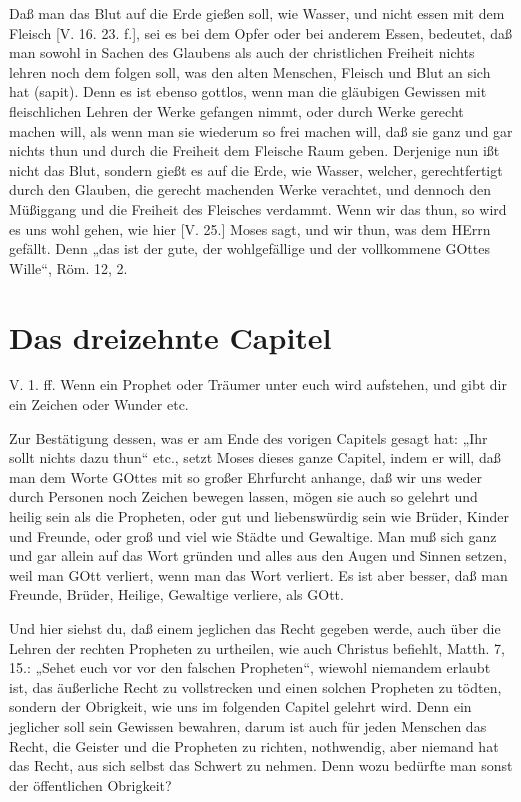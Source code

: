 Daß man das Blut auf die Erde gießen soll, wie Wasser, und nicht essen mit dem Fleisch [V. 16. 23. f.], sei es bei dem Opfer oder bei anderem Essen, bedeutet, daß man sowohl in Sachen des Glaubens als auch der christlichen Freiheit nichts lehren noch dem folgen soll, was den alten Menschen, Fleisch und Blut an sich hat (sapit). Denn es ist ebenso gottlos, wenn man die gläubigen Gewissen mit fleischlichen Lehren der Werke gefangen nimmt, oder durch Werke gerecht machen will, als wenn man sie wiederum so frei machen will, daß sie ganz und gar nichts thun und durch die Freiheit dem Fleische Raum geben. Derjenige nun ißt nicht das Blut, sondern gießt es auf die Erde, wie Wasser, welcher, gerechtfertigt durch den Glauben, die gerecht machenden Werke verachtet, und dennoch den Müßiggang und die Freiheit des Fleisches verdammt. Wenn wir das thun, so wird es uns wohl gehen, wie hier [V. 25.] Moses sagt, und wir thun, was dem HErrn gefällt. Denn „das ist der gute, der wohlgefällige und der vollkommene GOttes Wille“, Röm. 12, 2.

\section{Das dreizehnte Capitel}

\begin{schriftzitat}
V. 1. ff. Wenn ein Prophet oder Träumer unter euch wird aufstehen, und gibt dir ein Zeichen oder Wunder etc.
\end{schriftzitat}

Zur Bestätigung dessen, was er am Ende des vorigen Capitels gesagt hat: „Ihr sollt nichts dazu thun“ etc., setzt Moses dieses ganze Capitel, indem er will, daß man dem Worte GOttes mit so großer Ehrfurcht anhange, daß wir uns weder durch Personen noch Zeichen bewegen lassen, mögen sie auch so gelehrt und heilig sein als die Propheten, oder gut und liebenswürdig sein wie Brüder, Kinder und Freunde, oder groß und viel wie Städte und Gewaltige. Man muß sich ganz und gar allein auf das Wort gründen und alles aus den Augen und Sinnen setzen, weil man GOtt verliert, wenn man das Wort verliert. Es ist aber besser, daß man Freunde, Brüder, Heilige, Gewaltige verliere, als GOtt.

Und hier siehst du, daß einem jeglichen das Recht gegeben werde, auch über die Lehren der rechten Propheten zu urtheilen, wie auch Christus befiehlt, Matth. 7, 15.: „Sehet euch vor vor den falschen Propheten“, wiewohl niemandem erlaubt ist, das äußerliche Recht zu vollstrecken und einen solchen Propheten zu tödten, sondern der Obrigkeit, wie uns im folgenden Capitel gelehrt wird. Denn ein jeglicher soll sein Gewissen bewahren, darum ist auch für jeden Menschen das Recht, die Geister und die Propheten zu richten, nothwendig, aber niemand hat das Recht, aus sich selbst das Schwert zu nehmen. Denn wozu bedürfte man sonst der öffentlichen Obrigkeit?

